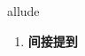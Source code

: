 
\begin{frame}
{\huge allude}
\begin{center}
\begin{enumerate}\Large
  \item \textbf{间接提到}
\end{enumerate}
\end{center}
\end{frame}
